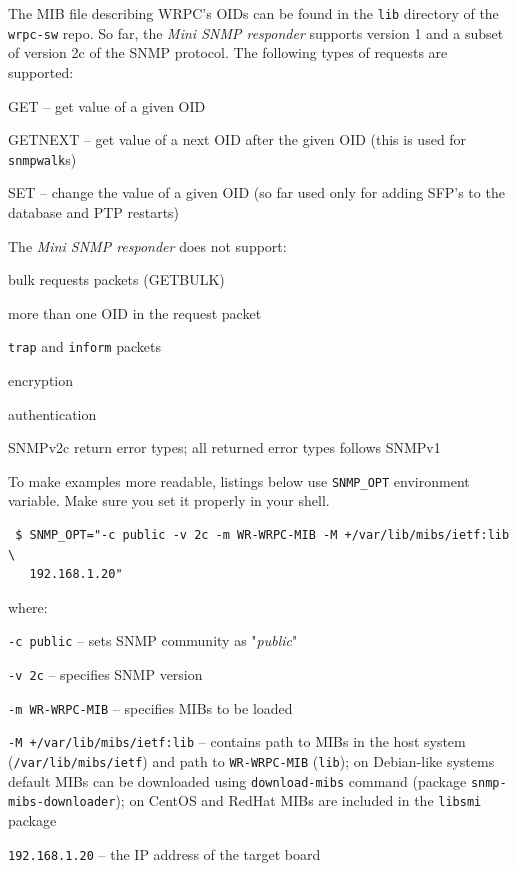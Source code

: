 \documentclass[a4paper, 12pt]{article}
\newcommand{\codeHook}[1]{\mbox{\ttfamily\MakeTextUppercase{#1}}}
\begin{document}
The MIB file describing \codeHook{wrpc}'s OIDs can be found in the \texttt{lib} directory
of the \texttt{wrpc-sw} repo.
So far, the \textit{Mini SNMP responder} supports version 1 and a subset of version
2c of the SNMP protocol.
The following types of requests are supported:
\begin{itemize*}
   \item GET -- get value of a given OID
   \item GETNEXT -- get value of a next OID after the given OID (this is used
         for \texttt{snmpwalk}s)
   \item SET -- change the value of a given OID (so far used only for adding
         SFP's to the database and PTP restarts)
\end{itemize*}
The \textit{Mini SNMP responder} does not support:
\begin{itemize*}
   \item bulk requests packets (GETBULK)
   \item more than one OID in the request packet
   \item \texttt{trap} and \texttt{inform} packets
   \item encryption
   \item authentication
   \item SNMPv2c return error types; all returned error types follows SNMPv1
\end{itemize*}
To make examples more readable, listings below use \texttt{SNMP\_OPT} environment
variable. Make sure you set it properly in your shell.
\begin{lstlisting}
 $ SNMP_OPT="-c public -v 2c -m WR-WRPC-MIB -M +/var/lib/mibs/ietf:lib \
   192.168.1.20"
\end{lstlisting}
where:
\begin{sloppypar} %
\begin{itemize*}
   \item \texttt{-c public} -- sets SNMP community as "\textit{public}"
   \item \texttt{-v 2c} -- specifies SNMP version
   \item \texttt{-m WR-WRPC-MIB} -- specifies MIBs to be loaded
   \item \texttt{-M +/var/lib/mibs/ietf:lib} -- contains path to MIBs in the host
         system (\texttt{/var/lib/mibs/ietf}) and path to \texttt{WR-WRPC-MIB} (\texttt{lib});
         on Debian-like systems default MIBs can be downloaded using
         \texttt{download-mibs} command (package \texttt{snmp-mibs-downloader}); on
         CentOS and RedHat MIBs are included in the \texttt{libsmi} package
   \item \texttt{192.168.1.20} -- the IP address of the target board
\end{itemize*}\end{sloppypar}\noindent
\end{document}
